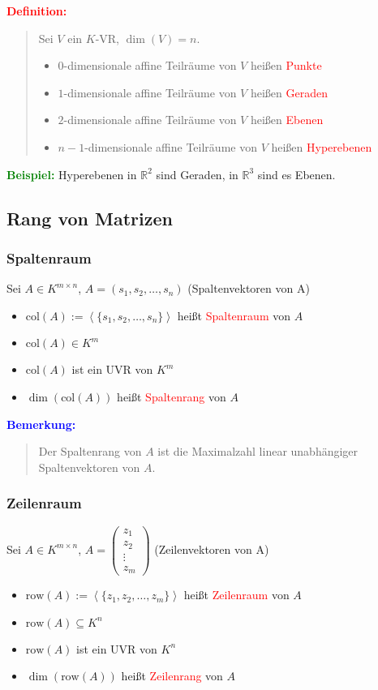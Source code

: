 \documentclass{article}
\newcommand{\red}[1]{\textcolor{red}{#1}}
\newcommand{\blue}[1]{\textcolor{blue}{#1}}
\newcommand{\green}[1]{\textcolor{green}{#1}}
\newcommand{\ex}{\green{\textbf{Beispiel: }}}
\newcommand{\de}[1]{\red{\textbf{Definition: }}\begin{quote}#1\end{quote}}
\newcommand{\an}[1]{\blue{\textbf{Bemerkung: }}\begin{quote}#1\end{quote}}
\newcommand{\R}{\mathbb{R}}
\newcommand{\spann}[1]{\left\langle#1\right\rangle}
\newcommand{\col}{\text{col}}
\newcommand{\row}{\text{row}}
\begin{document}
\de{
    Sei $V$ ein $K$-VR, $\dim(V) = n$.

    \begin{itemize}
        \item $0$-dimensionale affine Teilräume von $V$ heißen \red{Punkte}
        \item $1$-dimensionale affine Teilräume von $V$ heißen \red{Geraden}
        \item $2$-dimensionale affine Teilräume von $V$ heißen \red{Ebenen}
        \item $n-1$-dimensionale affine Teilräume von $V$ heißen \red{Hyperebenen}
    \end{itemize}
}
\ex Hyperebenen in $\R^2$ sind Geraden, in $\R^3$ sind es Ebenen.

\subsection{Rang von Matrizen}

\subsubsection{Spaltenraum}

Sei $A \in K^{m \times n}$, $A = (s_1, s_2,\dots,s_n)$ (Spaltenvektoren von A)
\begin{itemize}
    \item $\col(A) := \spann{\{s_1, s_2,\dots,s_n\}}$ heißt \red{Spaltenraum} von $A$
    \item $\col(A) \in K^m$
    \item $\col(A)$ ist ein UVR von $K^m$
    \item $\dim(\col(A))$ heißt \red{Spaltenrang} von $A$
\end{itemize}

\an{
    Der Spaltenrang von $A$ ist die Maximalzahl linear unabhängiger Spaltenvektoren von $A$.
}

\newpage
\subsubsection{Zeilenraum}

Sei $A \in K^{m \times n}$, $A = \begin{pmatrix}z_1 \\ z_2 \\ \vdots \\ z_m\end{pmatrix}$ (Zeilenvektoren von A)

\begin{itemize}
    \item $\row(A) := \spann{\{z_1, z_2,\dots,z_m\}}$ heißt \red{Zeilenraum} von $A$
    \item $\row(A) \subseteq K^n$
    \item $\row(A)$ ist ein UVR von $K^n$
    \item $\dim(\row(A))$ heißt \red{Zeilenrang} von $A$
\end{itemize}
\end{document}
